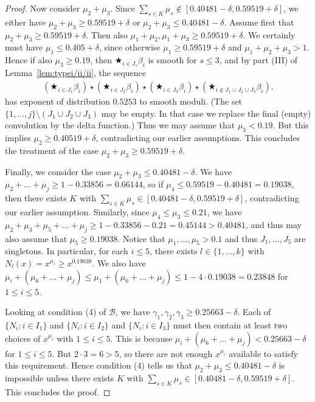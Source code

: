 \documentclass{amsart}
\numberwithin{equation}{section}
\begin{document}
\begin{proof}
\vspace{3mm} Now consider $\mu_2+\mu_3$. Since $\sum_{s \in K} \mu_s \not\in [0.40481-\delta,0.59519+\delta]$, we either have  $\mu_2+\mu_3 \geq 0.59519+ \delta$ or $\mu_2+\mu_3 \leq 0.40481-\delta$. Assume first that  $\mu_2+\mu_3 \geq 0.59519+ \delta$. Then also  $\mu_1+\mu_2, \mu_1+\mu_3 \geq 0.59519+ \delta$. We certainly must have $\mu_1 \leq 0.405+\delta$, since otherwise $\mu_1 \geq 0.59519+\delta$ and $\mu_1+\mu_2+\mu_3>1$.  Hence if also $\mu_3 \geq 0.19$, then $\bigstar_{i \in J_s} \beta_i$ is smooth for $s \leq 3$, and by part (III) of Lemma~\ref{lem:typei/ii/ii}, the sequence
\begin{align*}
(\bigstar_{i \in J_1} \beta_i) \star (\bigstar_{i \in J_2} \beta_i) \star (\bigstar_{i \in J_3} \beta_i) \star (\bigstar_{i \not\in J_1\cup J_2 \cup J_3} \beta_i).
\end{align*} 
has exponent of distribution $0.5253$ to smooth moduli. (The set $\{1,\dots,j\}\setminus (J_1 \cup J_2 \cup J_3)$ may be empty. In that case we replace the final (empty) convolution by the delta function.)  
 Thus we may assume that $\mu_3 <0.19$. But this implies $\mu_2 \geq 0.40519 +\delta$, contradicting our earlier assumptions. This concludes the treatment of the case $\mu_2+\mu_3 \geq 0.59519+ \delta$. 
 
 \vspace{3mm} Finally, we consider the case $\mu_2+\mu_3 \leq 0.40481-\delta$. We have $\mu_2 + \dots + \mu_j \geq 1-0.33856=0.66144$, so if $\mu_4 \leq 0.59519-0.40481=0.19038$, then there exists $K$ with $\sum_{s \in K} \mu_s \in [0.40481-\delta,0.59519+\delta]$, contradicting our earlier assumption. Similarly, since $\mu_4 \leq \mu_3 \leq 0.21$, we have $\mu_2 + \mu_3 +\mu_5 + \dots +\mu_j \geq 1-0.33856-0.21 =0.45144 > 0.40481$, and thus may also assume that $\mu_5 \geq 0.19038$.  Notice that $\mu_1, \dots, \mu_5 > 0.1$ and thus $J_1, \dots, J_5$ are singletons. In particular, for each $i \leq 5$, there exists $l \in \{1,\dots, k\}$ with  $N_l(x) = x^{\mu_i} \geq x^{0.19038}$. We also have $\mu_i + (\mu_6 + \dots + \mu_j)\leq \mu_1 + (\mu_6 + \dots + \mu_j) \leq 1-4\cdot 0.19038 =0.23848 $ for $1 \leq i \leq 5$. 
 

\vspace{3mm} 
  Looking at condition (4) of $\mathcal{B}$, we have $\gamma_1, \gamma_2, \gamma_3 \geq 0.25663-\delta$. Each of $\{N_i: i \in I_1\}$ and $\{N_i: i \in I_2\}$ and $\{N_i: i \in I_3\}$ must then contain at least two choices of $x^{\mu_i}$ with $1 \leq i \leq 5$. This is because $\mu_i + ( \mu_6+ \dots + \mu_j) < 0.25663-\delta$ for $1 \leq i \leq 5$. But $2 \cdot 3 = 6 >5$, so there are not enough $x^{\mu_i}$ available to satisfy this requirement. Hence condition (4) tells us that $\mu_2 + \mu_3 \leq 0.40481-\delta$ is impossible unless there exists $K$ with $\sum_{s \in K} \mu_s \in [0.40481-\delta,0.59519+\delta]$. This concludes the proof. 
\end{proof}
\end{document}
